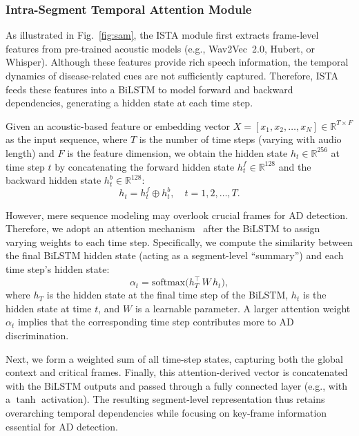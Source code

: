 \documentclass[journal]{IEEEtran}
\begin{document}
\subsubsection{Intra-Segment Temporal Attention Module}
\label{sec:ista}

As illustrated in Fig.~\ref{fig:sam}, the ISTA module first extracts frame-level features from pre-trained acoustic models (e.g., Wav2Vec~2.0, Hubert, or Whisper). Although these features provide rich speech information, the temporal dynamics of disease-related cues are not sufficiently captured. Therefore, ISTA feeds these features into a BiLSTM to model forward and backward dependencies, generating a hidden state at each time step.

Given an acoustic-based feature or embedding vector 
$X = [x_1, x_2, \dots, x_N] \in \mathbb{R}^{T \times F}$
as the input sequence, where $T$ is the number of time steps (varying with audio length) and $F$ is the feature dimension, we obtain the hidden state $\displaystyle h_t \in \mathbb{R}^{256}$ at time step $t$ by concatenating the forward hidden state $\displaystyle h_{t}^{f} \in \mathbb{R}^{128}$ and the backward hidden state $\displaystyle h_{t}^{b} \in \mathbb{R}^{128}$:
\begin{equation}
\label{eq:bilstm}
h_t = h_{t}^{f} \oplus h_{t}^{b}, {\quad t = 1,2,\dots,T}.
\end{equation}

However, mere sequence modeling may overlook crucial frames for AD detection.
Therefore, we adopt an attention mechanism~\cite{Attention} after the BiLSTM to assign varying weights to each time step. Specifically, we compute the similarity between the final BiLSTM hidden state (acting as a segment-level “summary”) and each time step’s hidden state:
\begin{equation}
\label{eq:attention}
\alpha_t = \mathrm{softmax}\bigl(h_{T}^{\top} \, W \, h_t\bigr),
\end{equation}
where $h_{T}$ is the hidden state at the final time step of the BiLSTM, $h_t$ is the hidden state at time $t$, and $W$ is a learnable parameter. A larger attention weight $\alpha_t$ implies that the corresponding time step contributes more to AD discrimination.

Next, we form a weighted sum of all time-step states, capturing both the global context and critical frames. Finally, this attention-derived vector is concatenated with the BiLSTM outputs and passed through a fully connected layer (e.g., with a $\tanh$ activation). The resulting segment-level representation thus retains overarching temporal dependencies while focusing on key-frame information essential for AD detection.
\end{document}
